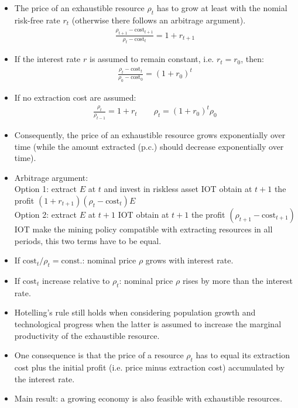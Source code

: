 \documentclass[a4paper,landscape,7pt,fleqn]{scrartcl}
\begin{document}
\begin{multicols*}{3}
\begin{itemize}
\item The price of an exhaustible resource $\rho_t$ has to grow at least with the nomial risk-free rate $r_t$ (otherwise there follows an arbitrage argument).
\begin{align*}
\frac{\rho_{t+1}-\text{cost}_{t+1}}{\rho_t-\text{cost}_t} = 1 + r_{t+1}
\end{align*}
\item If the interest rate $r$ is assumed to remain constant, i.e. $r_t = r_0$, then:
\begin{align*}
\frac{\rho_t - \text{cost}_t}{\rho_0 - \text{cost}_0} = (1+r_0)^t
\end{align*}
\item If no extraction cost are assumed:
\begin{align*}
\frac{\rho_t}{\rho_{t-1}} = 1 + r_t \qquad \rho_t = (1+r_0)^t \rho_0
\end{align*}
\item Consequently, the price of an exhaustible resource grows exponentially over time (while the amount extracted (p.c.) should decrease exponentially over time).
\item Arbitrage argument: \\
Option 1: extract $E$ at $t$ and invest in riskless asset IOT obtain at $t+1$ the profit $(1+r_{t+1}) (\rho_t - \text{cost}_t) E$ \\
Option 2: extract $E$ at $t+1$ IOT obtain at $t+1$ the profit $(\rho_{t+1}-\text{cost}_{t+1})$ \\
IOT make the mining policy compatible with extracting resources in all periods, this two terms have to be equal.
\item If $\text{cost}_t / \rho_t = \text{const.}$: nominal price $\rho$ grows with interest rate.
\item If $\text{cost}_t$ increase relative to $\rho_t$: nominal price $\rho$ rises by more than the interest rate.
\item Hotelling's rule still holds when considering population growth and technological progress when the latter is assumed to increase the marginal productivity of the exhaustible resource.
\item One consequence is that the price of a resource $\rho_t$  has to equal its extraction cost plus the initial profit (i.e. price minus extraction cost) accumulated by the interest rate.
\item Main result: a growing economy is also feasible with exhaustible resources.
\end{itemize}


\end{multicols*}
\end{document}
